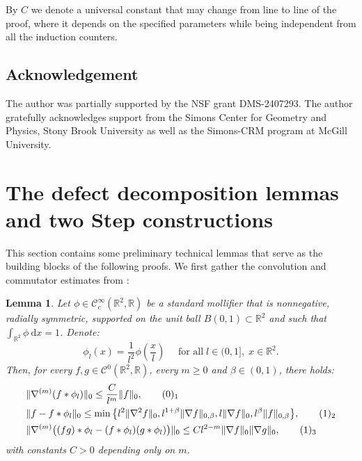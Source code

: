 \documentclass[reqno,twoside,11pt]{amsart}
\newcommand{\dx}{~\mathrm{d}x}
\newcommand{\R}{\mathbb{R}}
\numberwithin{equation}{section}
\theoremstyle{plain}
\newtheorem{lemma}[theorem]{Lemma}
\theoremstyle{definition}
\begin{document}
\smallskip

\noindent By $C$ we denote a universal constant that may change from line to
line of the proof, where it depends on the specified parameters while being
independent from all the induction counters.

\subsection{Acknowledgement} The author was partially supported by the
NSF grant DMS-2407293. The author gratefully acknowledges support from the
Simons Center for Geometry and Physics, Stony Brook University as well
as the Simons-CRM program at McGill University.

\section{The defect decomposition lemmas and two Step
  constructions}\label{sec_prepara1} 

This section contains some preliminary technical lemmas that serve as
the building blocks of the following proofs.
We first gather the convolution and commutator estimates from \cite{CDS}:

\begin{lemma}\label{lem_stima} 
Let $\phi\in\mathcal{C}_c^\infty(\R^2,\mathbb{R})$ be a standard
mollifier that is nonnegative, radially symmetric, supported on the
unit ball $B(0,1)\subset\R^2$ and such that $\int_{\mathbb{R}^2} \phi \dx = 1$. Denote: 
$$\phi_l (x) = \frac{1}{l^2}\phi(\frac{x}{l})\quad\mbox{ for all
}\; l\in (0,1], \;  x\in\R^2.$$
Then, for every $f,g\in\mathcal{C}^0(\mathbb{R}^2,\R)$, every
$m\geq 0$ and $\beta\in (0,1)$, there holds:
\begin{align*}
& \|\nabla^{(m)}(f\ast\phi_l)\|_{0} \leq
\frac{C}{l^m}\|f\|_0,\tag*{(\theequation)$_1$}\vspace{1mm} \refstepcounter{equation} \label{stima1}\\
& \|f - f\ast\phi_l\|_0 \leq \min\big\{l^2\|\nabla^{2}f\|_0,
l^{1+\beta}\|\nabla f\|_{0,\beta}, l\|\nabla f\|_0,
{l^\beta}\|f\|_{0,\beta}\big\}, \tag*{(\theequation)$_2$} \vspace{1mm} \label{stima2}\\
& \|\nabla^{(m)}\big((fg)\ast\phi_l - (f\ast\phi_l)
(g\ast\phi_l)\big)\|_0\leq {C}{l^{2- m}}\|\nabla f\|_{0}
\|\nabla g\|_{0}, \tag*{(\theequation)$_3$} \label{stima4}
\end{align*}
with constants $C>0$ depending only on $m$.
\end{lemma}
\end{document}
